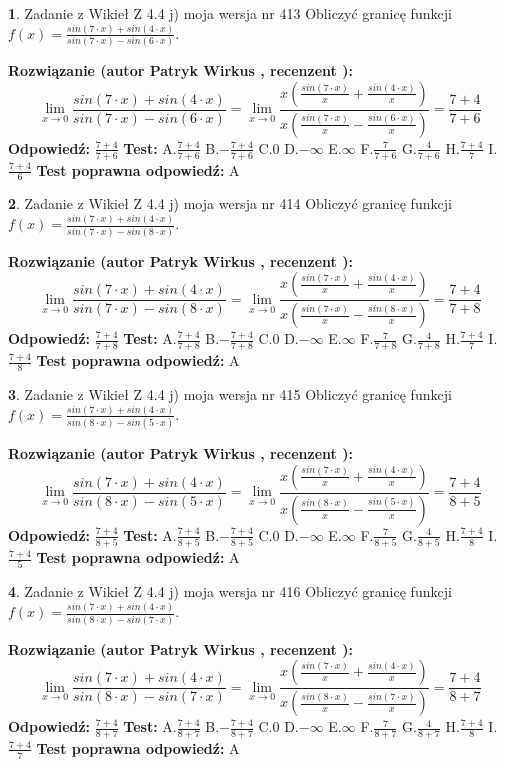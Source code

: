\documentclass[12pt, a4paper]{article}
\theoremstyle{definition} %
\newtheorem{zad}{}
\newcommand{\zadStart}[1]{\begin{zad}#1\newline}
\newcommand{\zadStop}{\end{zad}}
\newcommand{\rozwStart}[2]{\noindent \textbf{Rozwiązanie (autor #1 , recenzent #2): }\newline}
\newcommand{\rozwStop}{\newline}
\newcommand{\odpStart}{\noindent \textbf{Odpowiedź:}\newline}
\newcommand{\odpStop}{\newline}
\newcommand{\testStart}{\noindent \textbf{Test:}\newline}
\newcommand{\testStop}{\newline}
\newcommand{\kluczStart}{\noindent \textbf{Test poprawna odpowiedź:}\newline}
\newcommand{\kluczStop}{\newline}
\begin{document}
\zadStart{Zadanie z Wikieł Z 4.4 j) moja wersja nr 413}
Obliczyć granicę funkcji $f(x)=\frac{sin(7\cdot x) +sin(4\cdot x)}{sin(7\cdot x) -sin(6\cdot x)}$.
\zadStop
\rozwStart{Patryk Wirkus}{}
$$\lim\limits_{x\to 0}\frac{sin(7\cdot x) +sin(4\cdot x)}{sin(7\cdot x) -sin(6\cdot x)}=\lim\limits_{x\to 0}\frac{x(\frac{sin(7\cdot x)}{x}+\frac{sin(4\cdot x)}{x})}{x(\frac{sin(7\cdot x)}{x}-\frac{sin(6\cdot x)}{x})}=\frac{7+4}{7+6}$$
\rozwStop
\odpStart
$\frac{7+4}{7+6}$
\odpStop
\testStart
A.$\frac{7+4}{7+6}$
B.$-\frac{7+4}{7+6}$
C.$0$
D.$-\infty$
E.$\infty$
F.$\frac{7}{7+6}$
G.$\frac{4}{7+6}$
H.$\frac{7+4}{7}$
I.$\frac{7+4}{6}$
\testStop
\kluczStart
A
\kluczStop



\zadStart{Zadanie z Wikieł Z 4.4 j) moja wersja nr 414}
Obliczyć granicę funkcji $f(x)=\frac{sin(7\cdot x) +sin(4\cdot x)}{sin(7\cdot x) -sin(8\cdot x)}$.
\zadStop
\rozwStart{Patryk Wirkus}{}
$$\lim\limits_{x\to 0}\frac{sin(7\cdot x) +sin(4\cdot x)}{sin(7\cdot x) -sin(8\cdot x)}=\lim\limits_{x\to 0}\frac{x(\frac{sin(7\cdot x)}{x}+\frac{sin(4\cdot x)}{x})}{x(\frac{sin(7\cdot x)}{x}-\frac{sin(8\cdot x)}{x})}=\frac{7+4}{7+8}$$
\rozwStop
\odpStart
$\frac{7+4}{7+8}$
\odpStop
\testStart
A.$\frac{7+4}{7+8}$
B.$-\frac{7+4}{7+8}$
C.$0$
D.$-\infty$
E.$\infty$
F.$\frac{7}{7+8}$
G.$\frac{4}{7+8}$
H.$\frac{7+4}{7}$
I.$\frac{7+4}{8}$
\testStop
\kluczStart
A
\kluczStop



\zadStart{Zadanie z Wikieł Z 4.4 j) moja wersja nr 415}
Obliczyć granicę funkcji $f(x)=\frac{sin(7\cdot x) +sin(4\cdot x)}{sin(8\cdot x) -sin(5\cdot x)}$.
\zadStop
\rozwStart{Patryk Wirkus}{}
$$\lim\limits_{x\to 0}\frac{sin(7\cdot x) +sin(4\cdot x)}{sin(8\cdot x) -sin(5\cdot x)}=\lim\limits_{x\to 0}\frac{x(\frac{sin(7\cdot x)}{x}+\frac{sin(4\cdot x)}{x})}{x(\frac{sin(8\cdot x)}{x}-\frac{sin(5\cdot x)}{x})}=\frac{7+4}{8+5}$$
\rozwStop
\odpStart
$\frac{7+4}{8+5}$
\odpStop
\testStart
A.$\frac{7+4}{8+5}$
B.$-\frac{7+4}{8+5}$
C.$0$
D.$-\infty$
E.$\infty$
F.$\frac{7}{8+5}$
G.$\frac{4}{8+5}$
H.$\frac{7+4}{8}$
I.$\frac{7+4}{5}$
\testStop
\kluczStart
A
\kluczStop



\zadStart{Zadanie z Wikieł Z 4.4 j) moja wersja nr 416}
Obliczyć granicę funkcji $f(x)=\frac{sin(7\cdot x) +sin(4\cdot x)}{sin(8\cdot x) -sin(7\cdot x)}$.
\zadStop
\rozwStart{Patryk Wirkus}{}
$$\lim\limits_{x\to 0}\frac{sin(7\cdot x) +sin(4\cdot x)}{sin(8\cdot x) -sin(7\cdot x)}=\lim\limits_{x\to 0}\frac{x(\frac{sin(7\cdot x)}{x}+\frac{sin(4\cdot x)}{x})}{x(\frac{sin(8\cdot x)}{x}-\frac{sin(7\cdot x)}{x})}=\frac{7+4}{8+7}$$
\rozwStop
\odpStart
$\frac{7+4}{8+7}$
\odpStop
\testStart
A.$\frac{7+4}{8+7}$
B.$-\frac{7+4}{8+7}$
C.$0$
D.$-\infty$
E.$\infty$
F.$\frac{7}{8+7}$
G.$\frac{4}{8+7}$
H.$\frac{7+4}{8}$
I.$\frac{7+4}{7}$
\testStop
\kluczStart
A
\kluczStop
\end{document}
